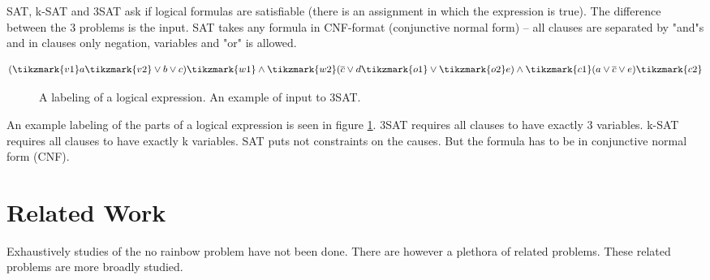 \documentclass[msc,lith,english]{liuthesis}
\begin{document}
SAT, k-SAT and 3SAT ask if logical formulas are satisfiable (there is an assignment in which the expression is true).
The difference between the 3 problems is the input. SAT takes any formula in
CNF-format (conjunctive normal form) -- all clauses are separated by "and"s and
in clauses only negation, variables and "or" is allowed.

$$
  (\tikzmark{v1}a\tikzmark{v2} \vee b \vee c) \tikzmark{w1}\wedge\tikzmark{w2} (\overline{c} \vee d \tikzmark{o1}\vee\tikzmark{o2} e) \wedge \tikzmark{c1}(a \vee \overline{c} \vee e)\tikzmark{c2}
$$
\begin{figure}[h]
  \caption{A labeling of a logical expression. An example of input to 3SAT.}
  \label{figExSAT}
\end{figure}


An example labeling of the  parts of a logical expression is seen in figure
\ref{figExSAT}. 3SAT requires all clauses to have exactly 3 variables. k-SAT requires all clauses to have exactly k variables. SAT puts not constraints on the causes. But the formula has to be in conjunctive normal form (CNF).




\chapter{Related Work}
Exhaustively studies of the no rainbow problem have not been done. There are however a plethora of related problems.
These related problems are more broadly studied.
\end{document}
